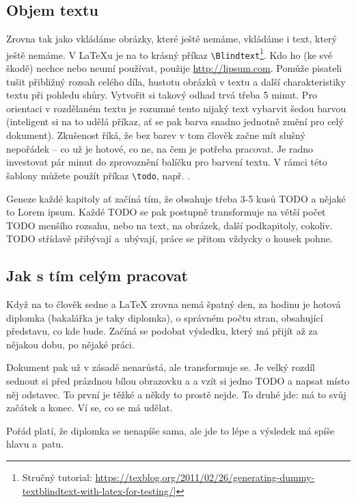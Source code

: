 \subsection*{Objem textu}
Zrovna tak jako vkládáme obrázky, které ještě nemáme, vkládáme i text, který ještě nemáme. V \LaTeX{}u je na to krásný příkaz \texttt{\textbackslash Blindtext}\footnote{Stručný tutorial: \url{https://texblog.org/2011/02/26/generating-dummy-textblindtext-with-latex-for-testing/]}}. Kdo ho (ke své škodě) nechce nebo neumí používat, použije \url{http://lipsum.com}. Pomůže pisateli tušit přibližný rozsah celého díla, hustotu obrázků v textu a další charakteristiky textu při pohledu shůry. Vytvořit si takový odhad trvá třeba 5 minut. Pro orientaci v rozdělaném textu je rozumné tento nijaký text vybarvit šedou barvou (inteligent si na to udělá příkaz, ať se pak barva snadno jednotně změní pro celý dokument). Zkušenost říká, že bez barev v tom člověk začne mít slušný nepořádek -- co už je hotové, co ne, na čem je potřeba pracovat. Je radno investovat pár minut do zprovoznění balíčku pro barvení textu. V rámci této šablony můžete použít příkaz \verb|\todo|, např. .

Geneze každé kapitoly ať začíná tím, že obsahuje třeba 3-5 kusů TODO a nějaké to Lorem ipsum. Každé TODO se pak postupně transformuje na větší počet TODO menšího rozsahu, nebo na text, na obrázek, další podkapitoly, cokoliv. TODO střídavě přibývají a~ubývají, práce se přitom vždycky o kousek pohne.

\subsection*{Jak s tím celým pracovat}
Když na to člověk sedne a \LaTeX{} zrovna nemá špatný den, za hodinu je hotová diplomka (bakalářka je taky diplomka), o správném počtu stran, obsahující představu, co kde bude. Začíná se podobat výsledku, který má přijít až za nějakou dobu, po nějaké práci.

Dokument pak už v zásadě nenarůstá, ale transformuje se. Je velký rozdíl sednout si před prázdnou bílou obrazovku a  a vzít si jedno TODO a napsat místo něj odstavec. To první je těžké a někdy to prostě nejde. To druhé jde: má to svůj začátek a konec. Ví se, co se má udělat.

Pořád platí, že diplomka se nenapíše sama, ale jde to lépe a výsledek má spíše hlavu a~patu.


